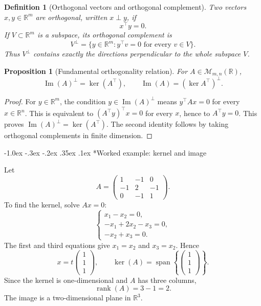\documentclass[10pt]{article}
\makeatletter
\renewcommand\subsection{\@startsection{subsection}{2}{\z@}%
  {-1.0ex \@plus -.3ex \@minus -.2ex}%
  {.35ex \@plus .1ex}%
  {\normalfont\normalsize\bfseries}}
\theoremstyle{compactdefinition}
\newtheorem{definition}{Definition}[section]
\theoremstyle{compactproposition}
\newtheorem{proposition}{Proposition}[section]
\newcommand{\R}{\mathbb{R}}
\newcommand{\M}{\mathcal{M}}
\newcommand{\rank}{\operatorname{rank}}
\newcommand{\im}{\operatorname{Im}}
\newcommand{\Span}{\operatorname{span}}
\makeatother
\begin{document}
\begin{definition}[Orthogonal vectors and orthogonal complement]
Two vectors $x,y\in\R^m$ are orthogonal, written $x\perp y$, if
\[
x^\top y=0.
\]
If $V\subset\R^m$ is a subspace, its orthogonal complement is
\[
V^\perp
=\{y\in\R^m:y^\top v=0\text{ for every }v\in V\}.
\]
Thus $V^\perp$ contains exactly the directions perpendicular to the whole
subspace $V$.
\end{definition}

\begin{proposition}[Fundamental orthogonality relation]
For $A\in\M_{m,n}(\R)$,
\[
\im(A)^\perp=\ker(A^\top),
\qquad
\im(A)=(\ker A^\top)^\perp.
\]
\end{proposition}

\begin{proof}
For $y\in\R^m$, the condition $y\in\im(A)^\perp$ means
$y^\top Ax=0$ for every $x\in\R^n$. This is equivalent to
$(A^\top y)^\top x=0$ for every $x$, hence to $A^\top y=0$. This proves
$\im(A)^\perp=\ker(A^\top)$. The second identity follows by taking orthogonal
complements in finite dimension.
\end{proof}

\subsection*{Worked example: kernel and image}

Let
\[
A=
\begin{pmatrix}
1&-1&0\\
-1&2&-1\\
0&-1&1
\end{pmatrix}.
\]
To find the kernel, solve $Ax=0$:
\[
\begin{cases}
x_1-x_2=0,\\
-x_1+2x_2-x_3=0,\\
-x_2+x_3=0.
\end{cases}
\]
The first and third equations give $x_1=x_2$ and $x_3=x_2$. Hence
\[
x=t\begin{pmatrix}1\\1\\1\end{pmatrix},
\qquad
\ker(A)=\Span\left\{\begin{pmatrix}1\\1\\1\end{pmatrix}\right\}.
\]
Since the kernel is one-dimensional and $A$ has three columns,
\[
\rank(A)=3-1=2.
\]
The image is a two-dimensional plane in $\R^3$.
\end{document}
